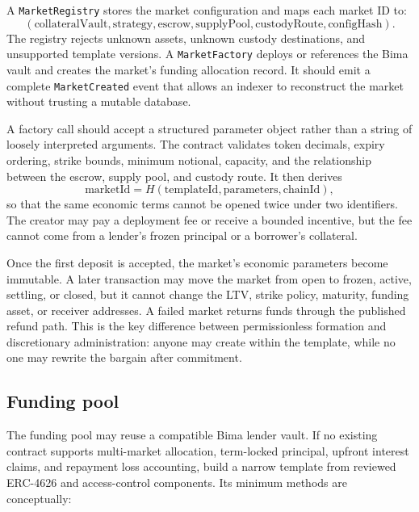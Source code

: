 \documentclass[11pt,oneside]{article}
\begin{document}
A \texttt{MarketRegistry} stores the market configuration and maps each market ID to:
\[
(\mathrm{collateralVault},\mathrm{strategy},\mathrm{escrow},\mathrm{supplyPool},\mathrm{custodyRoute},\mathrm{configHash}).
\]
The registry rejects unknown assets, unknown custody destinations, and unsupported template versions. A \texttt{MarketFactory} deploys or references the Bima vault and creates the market's funding allocation record. It should emit a complete \texttt{MarketCreated} event that allows an indexer to reconstruct the market without trusting a mutable database.

A factory call should accept a structured parameter object rather than a string
of loosely interpreted arguments. The contract validates token decimals,
expiry ordering, strike bounds, minimum notional, capacity, and the relationship
between the escrow, supply pool, and custody route. It then derives
\[
\mathrm{marketId}=H(\mathrm{templateId},\mathrm{parameters},\mathrm{chainId}),
\]
so that the same economic terms cannot be opened twice under two identifiers.
The creator may pay a deployment fee or receive a bounded incentive, but the
fee cannot come from a lender's frozen principal or a borrower's collateral.

Once the first deposit is accepted, the market's economic parameters become
immutable. A later transaction may move the market from open to frozen, active,
settling, or closed, but it cannot change the LTV, strike policy, maturity,
funding asset, or receiver addresses. A failed market returns funds through the
published refund path. This is the key difference between permissionless
formation and discretionary administration: anyone may create within the
template, while no one may rewrite the bargain after commitment.

\subsection{Funding pool}

The funding pool may reuse a compatible Bima lender vault. If no existing contract supports multi-market allocation, term-locked principal, upfront interest claims, and repayment loss accounting, build a narrow template from reviewed ERC-4626 and access-control components. Its minimum methods are conceptually:
\end{document}
